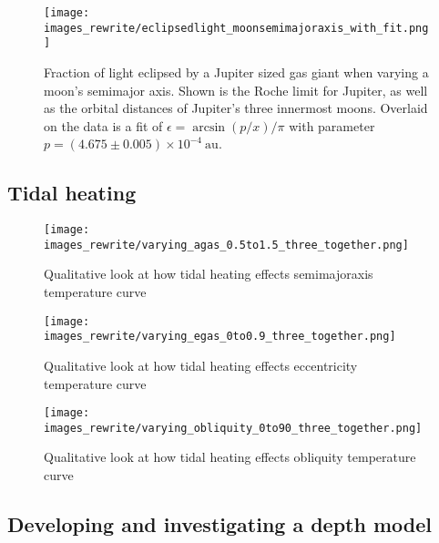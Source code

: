 \documentclass[12pt, onecolumn]{revtex4-2}    %
\begin{document}
\begin{figure}
  \texttt{[image: images\_rewrite/eclipsedlight\_moonsemimajoraxis\_with\_fit.png]}
  \caption{
    Fraction of light eclipsed by a Jupiter sized gas giant when varying a moon's semimajor axis.
    Shown is the Roche limit for Jupiter, as well as the orbital distances of Jupiter's three innermost moons.
    Overlaid on the data is a fit of $\epsilon = \arcsin(p/x)/\pi$ with parameter $p = (4.675\pm0.005)\times 10^{-4}\ \text{au}$.
  }
  \label{fig:quantitative_eclipsing_moon_semimajor_axis}
\end{figure}

\subsection{Tidal heating} \label{ssec:InvTidalHeating}
\begin{figure}
  \texttt{[image: images\_rewrite/varying\_agas\_0.5to1.5\_three\_together.png]}
  \caption{
    Qualitative look at how tidal heating effects semimajoraxis temperature curve
  }
  \label{fig:qualitative_tidalheating_semimajoraxis}
\end{figure}

\begin{figure}
  \texttt{[image: images\_rewrite/varying\_egas\_0to0.9\_three\_together.png]}
  \caption{
    Qualitative look at how tidal heating effects eccentricity temperature curve
  }
  \label{fig:qualitative_tidalheating_eccentrcity}
\end{figure}

\begin{figure}
  \texttt{[image: images\_rewrite/varying\_obliquity\_0to90\_three\_together.png]}
  \caption{
    Qualitative look at how tidal heating effects obliquity temperature curve
  }
  \label{fig:qualitative_tidalheating_obliquity}
\end{figure}




\subsection{Developing and investigating a depth model} \label{ssec:DevInvDepthModel} %
\end{document}
